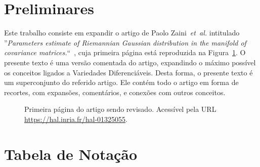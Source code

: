 \documentclass[a4paper,titlepage]{article}
\begin{document}


\section{Preliminares}

Este trabalho consiste em expandir o artigo de Paolo Zaini~\textit{et~al.}
intitulado ''\textit{Parameters estimate of Riemannian Gaussian distribution in
the manifold of covariance matrices.}``~\cite{zanini:hal-01325055},
cuja primeira página está reproduzida na Figura~\ref{fig:paper:page1}.
O presente texto é uma versão comentada do artigo,
expandindo o máximo possível os conceitos ligados a Variedades Diferenciáveis.
Desta forma, o presente texto é um superconjunto do referido artigo.
Ele contém todo o artigo em forma de recortes, com expansões, comentários, e
conexões com outros conceitos.

\begin{figure}
\centering
{}
\caption{%
Primeira página do artigo sendo revisado. Acessível pela URL
\url{https://hal.inria.fr/hal-01325055}.
}\label{fig:paper:page1}
\end{figure}

\section{Tabela de Notação}
\end{document}

